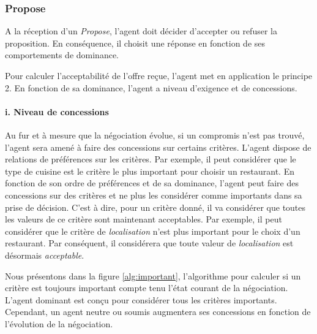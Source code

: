 	
%	
	
	
	
	 
	\subsubsection{Propose}
	A la réception d'un \emph{Propose}, l'agent doit décider d'accepter ou refuser la proposition. En conséquence, il choisit une réponse en fonction de ses comportements de dominance.
	
	Pour calculer l'acceptabilité de l'offre reçue, l'agent met en application le principe 2. En fonction de sa dominance, l'agent a niveau d'exigence et de concessions. 
	\paragraph{i. Niveau de concessions}
	
	Au fur et à mesure que la négociation évolue, si un compromis n'est pas trouvé, l'agent sera amené à faire des concessions sur certains critères. L'agent dispose de relations de préférences sur les critères. Par exemple, il peut considérer que le type de cuisine est le critère le plus important pour choisir un restaurant. En fonction de son ordre de préférences et de sa dominance, l'agent peut faire des concessions sur des critères et ne plus les considérer comme importants dans sa prise de décision. C'est à dire, pour un critère donné, il va considérer que toutes les valeurs de ce critère sont maintenant acceptables. 
	Par exemple, il peut considérer que le critère de \emph{localisation} n'est plus important pour le choix d'un restaurant. Par conséquent, il considérera que toute valeur de \emph{localisation} est désormais \emph{acceptable}.
	
	Nous présentons dans la figure \ref{alg:important}, l'algorithme pour calculer si un critère est toujours important compte tenu l'état courant de la négociation. L'agent dominant est conçu pour considérer tous les critères importants. Cependant, un agent neutre ou soumis augmentera ses concessions en fonction de l'évolution de la négociation. 
	
